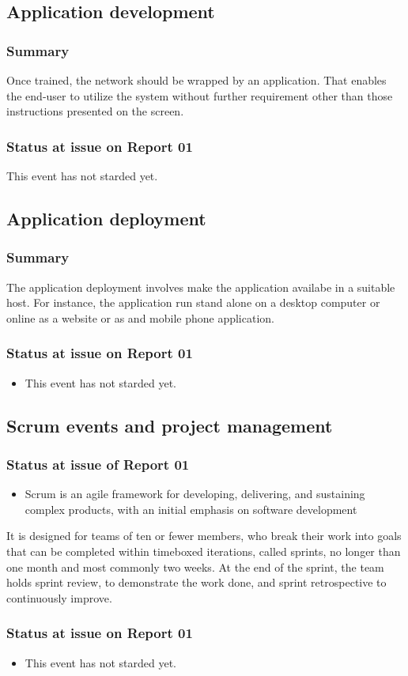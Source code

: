 \documentclass{article}
\begin{document}
\subsection{Application development}
\label{sec:org7a98c7e}
\subsubsection{Summary}
\label{sec:orga4be3c7}
Once trained, the network should be wrapped by an application.
That enables the end-user to utilize the system without further requirement other than those instructions presented on the screen.
\subsubsection{Status at issue on Report 01}
\label{sec:orge2020f2}
This event has not starded yet.

\subsection{Application deployment}
\label{sec:org4bafb26}
\subsubsection{Summary}
\label{sec:org759cb4e}
The application deployment involves make the application availabe in a suitable host.
For instance, the application run stand alone on a desktop computer or online as a website or as and mobile phone application.
\subsubsection{Status at issue on Report 01}
\label{sec:org1613cf9}
\begin{itemize}
\item This event has not starded yet.
\end{itemize}

\subsection{Scrum events and project management}
\label{sec:orgf460029}
\subsubsection{Status at issue of Report 01}
\label{sec:orgc35578a}
\begin{itemize}
\item Scrum is an agile framework for developing, delivering, and sustaining complex products, with an initial emphasis on software development
\end{itemize}
It is designed for teams of ten or fewer members, who break their work into goals that can be completed within timeboxed iterations, called sprints, no longer than one month and most commonly two weeks.
At the end of the sprint, the team holds sprint review, to demonstrate the work done, and sprint retrospective to continuously improve.
\subsubsection{Status at issue on Report 01}
\label{sec:orge4b7ab5}
\begin{itemize}
\item This event has not starded yet.
\end{itemize}
\end{document}
